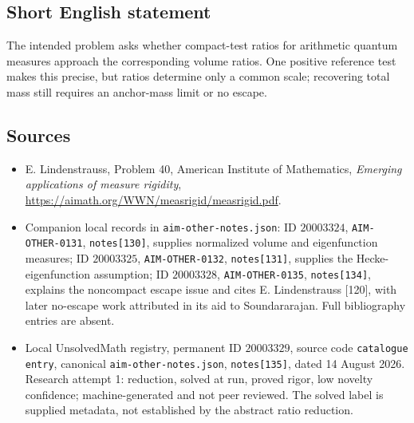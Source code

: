 \documentclass[11pt]{article}
\begin{document}
\subsection{Short English statement}
The intended problem asks whether compact-test ratios for arithmetic quantum measures approach the corresponding volume ratios. One positive reference test makes this precise, but ratios determine only a common scale; recovering total mass still requires an anchor-mass limit or no escape.
\subsection{Sources}
\begin{itemize}
\item E. Lindenstrauss, Problem 40, American Institute of Mathematics, \emph{Emerging applications of measure rigidity}, \url{https://aimath.org/WWN/measrigid/measrigid.pdf}.
\item Companion local records in \texttt{aim-other-notes.json}: ID $20003324$, \texttt{AIM-OTHER-0131}, \texttt{notes[130]}, supplies normalized volume and eigenfunction measures; ID $20003325$, \texttt{AIM-OTHER-0132}, \texttt{notes[131]}, supplies the Hecke-eigenfunction assumption; ID $20003328$, \texttt{AIM-OTHER-0135}, \texttt{notes[134]}, explains the noncompact escape issue and cites E. Lindenstrauss [120], with later no-escape work attributed in its aid to Soundararajan. Full bibliography entries are absent.
\item Local UnsolvedMath registry, permanent ID $20003329$, source code \texttt{catalogue entry}, canonical \texttt{aim-other-notes.json}, \texttt{notes[135]}, dated 14 August 2026. Research attempt 1: reduction, solved at run, proved rigor, low novelty confidence; machine-generated and not peer reviewed. The solved label is supplied metadata, not established by the abstract ratio reduction.
\end{itemize}
\end{document}
